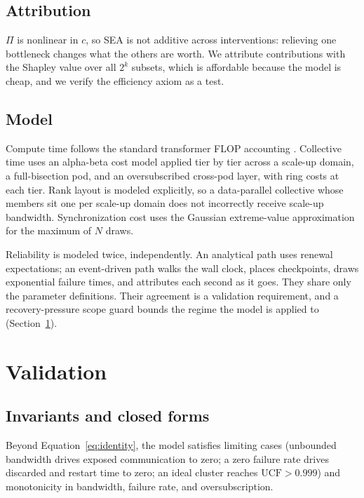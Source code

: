 \documentclass[11pt]{article}
\begin{document}
\subsection{Attribution}

$\Pi$ is nonlinear in $c$, so SEA is not additive across interventions: relieving
one bottleneck changes what the others are worth. We attribute contributions with
the Shapley value \citep{shapley1953value} over all $2^k$ subsets, which is
affordable because the model is cheap, and we verify the efficiency axiom as a
test.

\subsection{Model}

Compute time follows the standard transformer FLOP accounting
\citep{narayanan2021megatron}. Collective time uses an alpha-beta cost model
applied tier by tier across a scale-up domain, a full-bisection pod, and an
oversubscribed cross-pod layer, with ring costs at each tier. Rank layout is
modeled explicitly, so a data-parallel collective whose members sit one per
scale-up domain does not incorrectly receive scale-up bandwidth. Synchronization
cost uses the Gaussian extreme-value approximation for the maximum of $N$ draws.

Reliability is modeled twice, independently. An analytical path uses renewal
expectations; an event-driven path walks the wall clock, places checkpoints,
draws exponential failure times, and attributes each second as it goes. They
share only the parameter definitions. Their agreement is a
validation requirement, and a recovery-pressure scope guard bounds the regime
the model is applied to (Section~\ref{sec:validation}).

\section{Validation}
\label{sec:validation}

\subsection{Invariants and closed forms}

Beyond Equation~\ref{eq:identity}, the model satisfies limiting cases
(unbounded bandwidth drives exposed communication to zero; a zero failure rate
drives discarded and restart time to zero; an ideal cluster reaches
$\mathrm{UCF} > 0.999$) and monotonicity in bandwidth, failure rate, and
oversubscription.
\end{document}
